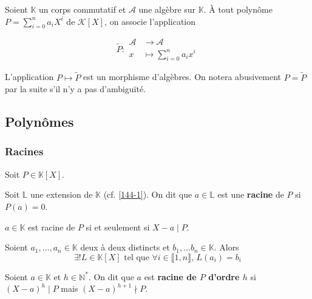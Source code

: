




	Soient $\mathbb{K}$ un corps commutatif et $\mathcal{A}$ une algèbre sur $\mathbb{K}$. À tout polynôme $P = \sum_{i=0}^{n} a_i X^i$ de $\mathcal{K}[X]$, on associe l'application

	\[
	\widetilde{P} :
	\begin{array}{cl}
		\mathcal{A} &\rightarrow \mathcal{A} \\
		x &\mapsto \sum_{i=0}^{n} a_i x^i
	\end{array}
	\]

	L'application $P \mapsto \widetilde{P}$ est un morphisme d'algèbres. On notera abusivement $P = \widetilde{P}$ par la suite s'il n'y a pas d'ambiguïté.

	\subsection{Polynômes}

	\subsubsection{Racines}

	Soit $P \in \mathbb{K}[X]$.


	\begin{definition}
		Soit $\mathbb{L}$ une extension de $\mathbb{K}$ (cf. \cref{144-1}). On dit que $a \in \mathbb{L}$ est une \textbf{racine} de $P$ si $P(a) = 0$.
	\end{definition}

	\begin{proposition}
		$a \in \mathbb{K}$ est racine de $P$ si et seulement si $X - a \mid P$.
	\end{proposition}

	\begin{application}
		Soient $a_1, \dots, a_n \in \mathbb{K}$ deux à deux distincts et $b_1, \dots b_n \in \mathbb{K}$. Alors
		\[ \exists! L \in \mathbb{K}[X] \text{ tel que } \forall i \in \llbracket 1, n \rrbracket, \, L(a_i) = b_i \]
	\end{application}

	\begin{definition}
		Soient $a \in \mathbb{K}$ et $h \in \mathbb{N}^*$. On dit que $a$ est \textbf{racine de $P$ d'ordre $h$} si $(X-a)^h \mid P$ mais $(X-a)^{h+1} \nmid P$.
	\end{definition}

